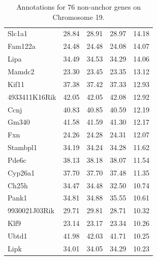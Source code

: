 \documentclass{article}
\begin{document}
\begin{table}[ht]
\begin{tabular}{lrrrr}
  Slc1a1 & 28.84 & 28.91 & 28.97 & 14.18 \\ 
  Fam122a & 24.48 & 24.48 & 24.08 & 14.07 \\ 
  Lipa & 34.49 & 34.53 & 34.29 & 14.06 \\ 
  Mamdc2 & 23.30 & 23.45 & 23.35 & 13.12 \\ 
  Kif11 & 37.38 & 37.42 & 37.33 & 12.93 \\ 
  4933411K16Rik & 42.05 & 42.05 & 42.08 & 12.92 \\ 
  Ccnj & 40.83 & 40.85 & 40.59 & 12.19 \\ 
  Gm340 & 41.58 & 41.59 & 41.30 & 12.17 \\ 
  Fxn & 24.26 & 24.28 & 24.31 & 12.07 \\ 
  Stambpl1 & 34.19 & 34.24 & 34.28 & 11.62 \\ 
  Pde6c & 38.13 & 38.18 & 38.07 & 11.54 \\ 
  Cyp26a1 & 37.70 & 37.70 & 37.48 & 11.35 \\ 
  Ch25h & 34.47 & 34.48 & 32.50 & 10.74 \\ 
  Pank1 & 34.81 & 34.88 & 35.55 & 10.61 \\ 
  9930021J03Rik & 29.71 & 29.81 & 28.71 & 10.32 \\ 
  Klf9 & 23.14 & 23.17 & 23.34 & 10.26 \\ 
  Ubtd1 & 41.98 & 42.03 & 41.71 & 10.25 \\ 
  Lipk & 34.01 & 34.05 & 34.29 & 10.23 \\ 
   \hline 
\end{tabular}
\endgroup
\caption{Annotations for 76 non-anchor genes on Chromosome 19.}
\end{table}
\end{document}
